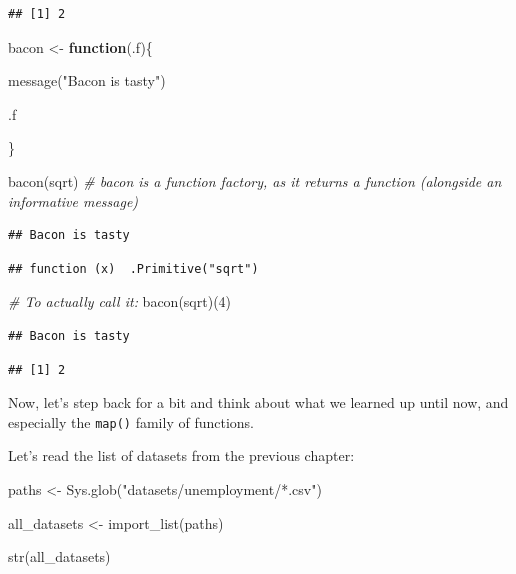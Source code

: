 \documentclass[
]{article}
\newenvironment{Shaded}{\begin{snugshade}}{\end{snugshade}}
\newcommand{\CommentTok}[1]{\textcolor[rgb]{0.56,0.35,0.01}{\textit{#1}}}
\newcommand{\ControlFlowTok}[1]{\textcolor[rgb]{0.13,0.29,0.53}{\textbf{#1}}}
\newcommand{\DecValTok}[1]{\textcolor[rgb]{0.00,0.00,0.81}{#1}}
\newcommand{\FunctionTok}[1]{\textcolor[rgb]{0.00,0.00,0.00}{#1}}
\newcommand{\NormalTok}[1]{#1}
\newcommand{\OtherTok}[1]{\textcolor[rgb]{0.56,0.35,0.01}{#1}}
\newcommand{\StringTok}[1]{\textcolor[rgb]{0.31,0.60,0.02}{#1}}
\begin{document}
\begin{verbatim}
## [1] 2
\end{verbatim}

\begin{Shaded}
\begin{Highlighting}[]
\NormalTok{bacon }\OtherTok{\textless{}{-}} \ControlFlowTok{function}\NormalTok{(.f)\{}

  \FunctionTok{message}\NormalTok{(}\StringTok{"Bacon is tasty"}\NormalTok{)}

\NormalTok{  .f}

\NormalTok{\}}

\FunctionTok{bacon}\NormalTok{(sqrt) }\CommentTok{\# \textasciigrave{}bacon\textasciigrave{} is a function factory, as it returns a function (alongside an informative message)}
\end{Highlighting}
\end{Shaded}

\begin{verbatim}
## Bacon is tasty
\end{verbatim}

\begin{verbatim}
## function (x)  .Primitive("sqrt")
\end{verbatim}

\begin{Shaded}
\begin{Highlighting}[]
\CommentTok{\# To actually call it:}
\FunctionTok{bacon}\NormalTok{(sqrt)(}\DecValTok{4}\NormalTok{)}
\end{Highlighting}
\end{Shaded}

\begin{verbatim}
## Bacon is tasty
\end{verbatim}

\begin{verbatim}
## [1] 2
\end{verbatim}

Now, let's step back for a bit and think about what we learned up until now, and especially
the \texttt{map()} family of functions.

Let's read the list of datasets from the previous chapter:

\begin{Shaded}
\begin{Highlighting}[]
\NormalTok{paths }\OtherTok{\textless{}{-}} \FunctionTok{Sys.glob}\NormalTok{(}\StringTok{"datasets/unemployment/*.csv"}\NormalTok{)}

\NormalTok{all\_datasets }\OtherTok{\textless{}{-}} \FunctionTok{import\_list}\NormalTok{(paths)}

\FunctionTok{str}\NormalTok{(all\_datasets)}
\end{Highlighting}
\end{Shaded}
\end{document}
